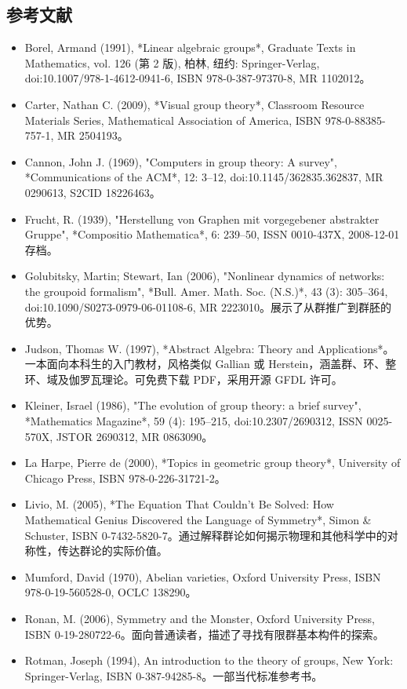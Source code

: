 \subsection{参考文献}
\begin{itemize}
\item Borel, Armand (1991), *Linear algebraic groups*, Graduate Texts in Mathematics, vol. 126 (第 2 版), 柏林, 纽约: Springer-Verlag, doi:10.1007/978-1-4612-0941-6, ISBN 978-0-387-97370-8, MR 1102012。
\item Carter, Nathan C. (2009), *Visual group theory*, Classroom Resource Materials Series, Mathematical Association of America, ISBN 978-0-88385-757-1, MR 2504193。
\item Cannon, John J. (1969), "Computers in group theory: A survey", *Communications of the ACM*, 12: 3–12, doi:10.1145/362835.362837, MR 0290613, S2CID 18226463。
\item Frucht, R. (1939), "Herstellung von Graphen mit vorgegebener abstrakter Gruppe", *Compositio Mathematica*, 6: 239–50, ISSN 0010-437X, 2008-12-01 存档。
\item Golubitsky, Martin; Stewart, Ian (2006), "Nonlinear dynamics of networks: the groupoid formalism", *Bull. Amer. Math. Soc. (N.S.)*, 43 (3): 305–364, doi:10.1090/S0273-0979-06-01108-6, MR 2223010。展示了从群推广到群胚的优势。
\item Judson, Thomas W. (1997), *Abstract Algebra: Theory and Applications*。一本面向本科生的入门教材，风格类似 Gallian 或 Herstein，涵盖群、环、整环、域及伽罗瓦理论。可免费下载 PDF，采用开源 GFDL 许可。
\item Kleiner, Israel (1986), "The evolution of group theory: a brief survey", *Mathematics Magazine*, 59 (4): 195–215, doi:10.2307/2690312, ISSN 0025-570X, JSTOR 2690312, MR 0863090。
\item La Harpe, Pierre de (2000), *Topics in geometric group theory*, University of Chicago Press, ISBN 978-0-226-31721-2。
\item Livio, M. (2005), *The Equation That Couldn't Be Solved: How Mathematical Genius Discovered the Language of Symmetry*, Simon & Schuster, ISBN 0-7432-5820-7。通过解释群论如何揭示物理和其他科学中的对称性，传达群论的实际价值。
\item Mumford, David (1970), Abelian varieties, Oxford University Press, ISBN 978-0-19-560528-0, OCLC 138290。
\item Ronan, M. (2006), Symmetry and the Monster, Oxford University Press, ISBN 0-19-280722-6。面向普通读者，描述了寻找有限群基本构件的探索。
\item Rotman, Joseph (1994), An introduction to the theory of groups, New York: Springer-Verlag, ISBN 0-387-94285-8。一部当代标准参考书。

\end{itemize}
